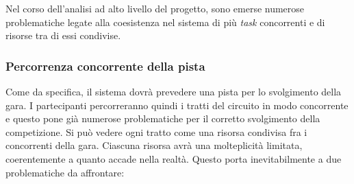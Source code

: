 \label{problematiche_concorrenza}
Nel corso dell'analisi ad alto livello del progetto, sono emerse numerose problematiche legate alla coesistenza nel 
sistema di pi\`{u} \emph{task} concorrenti e di risorse tra di essi condivise. \\
\subsubsection{Percorrenza concorrente della pista}
Come da specifica, il sistema dovr\`{a} prevedere una pista per lo svolgimento della gara. I partecipanti percorreranno quindi i tratti del circuito in modo concorrente e questo pone gi\`{a} numerose problematiche per il corretto svolgimento della competizione.
Si pu\`{o} vedere ogni tratto come una risorsa condivisa fra i concorrenti della gara. Ciascuna risorsa avr\`{a} una molteplicit\`{a} limitata, coerentemente a quanto accade nella realt\`{a}. Questo porta inevitabilmente a due problematiche da affrontare:
